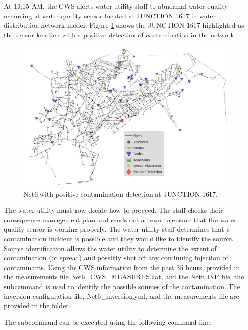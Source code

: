 At 10:15 AM, the CWS alerts water utility staff to abnormal water quality occurring 
at water quality sensor located at JUNCTION-1617 in water distribution network model. 
Figure \ref{fig:wds_sensors_detect} shows the JUNCTION-1617 highlighted as the sensor 
location with a positive detection of contamination in the network.  

\begin{figure}[h!]
\begin{center}
\includegraphics[scale=0.6]{graphics/Net6_Sensors_detect.JPG}
\caption{Net6 with positive contamination detection at JUNCTION-1617.}
\label{fig:wds_sensors_detect}
\end{center}
\end{figure}

The water utility must now decide how to proceed. The staff checks their 
consequence management plan and sends out a team to ensure that the water quality 
sensor is working properly. The water utility staff determines 
that a contamination incident is possible and they would like to identify the source.  
Source identification allows the water utility to determine the extent of contamination (or spread) and possibly
shut off any continuing injection of contaminants.  
Using the CWS information from the past 35 hours, provided in the measurements file 
Net6\_CWS\_MEASURES.dat, and the Net6 INP file, the  subcommand is used to 
identify the possible sources of the contamination. The inversion configuration file, 
Net6\_inversion.yml, and the measurements file are provided in the  folder.

The  subcommand can be executed using the following command line:

